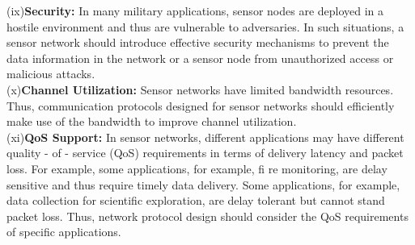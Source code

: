 \begin{justify}
(ix)\textbf{Security:} In many military applications, sensor nodes are deployed in a hostile environment and thus are vulnerable to adversaries. In such situations, a sensor network should introduce effective security mechanisms to prevent the data information in the network or a sensor node from unauthorized access or malicious attacks.\\
(x)\textbf{Channel Utilization:} Sensor networks have limited bandwidth resources. Thus, communication protocols designed for sensor networks should efficiently make use of the bandwidth to improve channel utilization.\\
(xi)\textbf{QoS Support:} In sensor networks, different applications may have different quality - of - service (QoS) requirements in terms of delivery latency and packet loss. For example, some applications, for example, fi re monitoring, are delay sensitive and thus require timely data delivery. Some applications, for example, data collection for scientific exploration, are delay tolerant but cannot stand packet loss. Thus, network protocol design should consider the QoS requirements of specific applications.\\
\end{justify}

